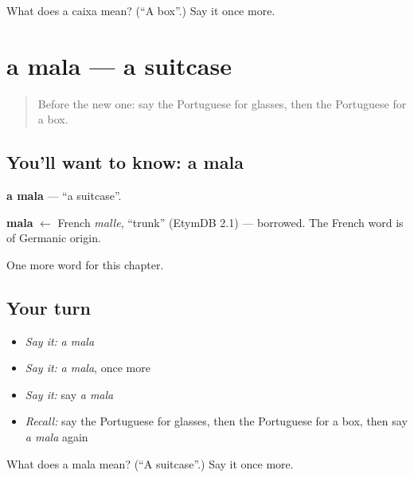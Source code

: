 \begin{tcolorbox}[breakable,colback=teal!4,colframe=teal!35!black,title={Before you move on}]
What does a caixa mean? (\textquotedblleft{}A box\textquotedblright{}.) Say it once more.
\end{tcolorbox}
\section[a mala]{a mala — a suitcase}

\label{lesson:PT-C54-mala}



\begin{quote}
Before the new one: say the Portuguese for glasses, then the Portuguese for a box.
\end{quote}

\subsection*{You'll want to know: a mala}
\textbf{a mala} — \textquotedblleft{}a suitcase\textquotedblright{}.

\begin{cousinweb}
\textbf{mala} $\leftarrow$ French \emph{malle}, \textquotedblleft{}trunk\textquotedblright{} (EtymDB 2.1) — borrowed. The French word is of Germanic origin.
\end{cousinweb}

\begin{grammarlens}[title={What you've built}]
One more word for this chapter.
\end{grammarlens}

\subsection*{Your turn}
\begin{itemize}
\raggedright
  \item \emph{Say it:} \emph{a mala}
  \item \emph{Say it:} \emph{a mala}, once more
  \item \emph{Say it:} say \emph{a mala}
  \item \emph{Recall:} say the Portuguese for glasses, then the Portuguese for a box, then say \emph{a mala} again
\end{itemize}

\begin{tcolorbox}[breakable,colback=teal!4,colframe=teal!35!black,title={Before you move on}]
What does a mala mean? (\textquotedblleft{}A suitcase\textquotedblright{}.) Say it once more.
\end{tcolorbox}
